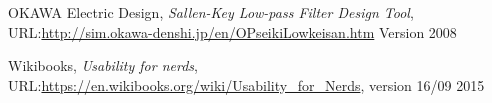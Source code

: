 \begin{thebibliography}{9}
	
	OKAWA Electric Design,
	\emph{Sallen-Key Low-pass Filter Design Tool},
	URL:\url{http://sim.okawa-denshi.jp/en/OPseikiLowkeisan.htm}
	Version 2008
	
	Wikibooks,
	\emph{Usability for nerds},
	URL:\url{https://en.wikibooks.org/wiki/Usability_for_Nerds},
	version 16/09 2015 
	
	
\end{thebibliography}

